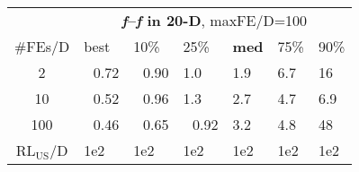 \begin{tabular}{c|llllll}
 & \multicolumn{6}{|c}{\textbf{\textit{f}\raisebox{-0.35ex}{1}--\textit{f}\raisebox{-0.35ex}{24} in 20-D}, maxFE/D=100}\\
\#FEs/D & best & 10\% & 25\% & \textbf{med} & 75\% & 90\%\\
2 & ~\,0.72 & ~\,0.90 & \hspace*{1ex}1.0 & \hspace*{1ex}1.9 & \hspace*{1ex}6.7 & 16\\
10 & ~\,0.52 & ~\,0.96 & \hspace*{1ex}1.3 & \hspace*{1ex}2.7 & \hspace*{1ex}4.7 & \hspace*{1ex}6.9\\
100 & ~\,0.46 & ~\,0.65 & ~\,0.92 & \hspace*{1ex}3.2 & \hspace*{1ex}4.8 & 48\\
$\text{RL}_{\text{US}}$/D & 1e2 & 1e2 & 1e2 & 1e2 & 1e2 & 1e2
\end{tabular}
